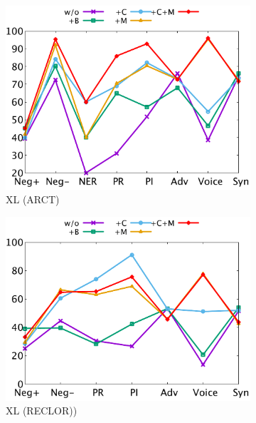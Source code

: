 \begin{figure}[th]
\begin{subfigure}[b]{0.24\textwidth}
\includegraphics[width=\columnwidth]{data/arct_xlnet.pdf}
\caption{XL (ARCT)}
\label{fig:arct_xlnet}
\end{subfigure}
\hfill
\begin{subfigure}[b]{0.24\textwidth}
\centering
\includegraphics[width=\columnwidth]{data/reclor_xlnet.pdf}
\caption{XL (RECLOR))}
\label{fig:reclor_xlnet}
\end{subfigure}
\newpage
\begin{subfigure}[b]{0.24\textwidth}
\centering

\end{subfigure}
\end{figure}
